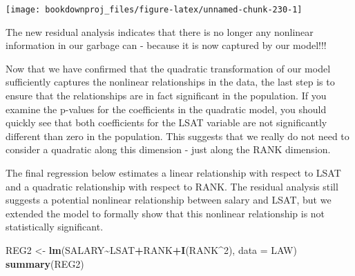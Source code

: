 \documentclass[
]{book}
\newenvironment{Shaded}{\begin{snugshade}}{\end{snugshade}}
\newcommand{\AttributeTok}[1]{\textcolor[rgb]{0.13,0.29,0.53}{#1}}
\newcommand{\DecValTok}[1]{\textcolor[rgb]{0.00,0.00,0.81}{#1}}
\newcommand{\FunctionTok}[1]{\textcolor[rgb]{0.13,0.29,0.53}{\textbf{#1}}}
\newcommand{\NormalTok}[1]{#1}
\newcommand{\OtherTok}[1]{\textcolor[rgb]{0.56,0.35,0.01}{#1}}
\newcommand{\SpecialCharTok}[1]{\textcolor[rgb]{0.81,0.36,0.00}{\textbf{#1}}}
\begin{document}
\begin{center}\texttt{[image: bookdownproj\_files/figure-latex/unnamed-chunk-230-1]} \end{center}

The new residual analysis indicates that there is no longer any nonlinear information in our garbage can - because it is now captured by our model!!!

Now that we have confirmed that the quadratic transformation of our model sufficiently captures the nonlinear relationships in the data, the last step is to ensure that the relationships are in fact significant in the population. If you examine the p-values for the coefficients in the quadratic model, you should quickly see that both coefficients for the LSAT variable are not significantly different than zero in the population. This suggests that we really do not need to consider a quadratic along this dimension - just along the RANK dimension.

The final regression below estimates a linear relationship with respect to LSAT and a quadratic relationship with respect to RANK. The residual analysis still suggests a potential nonlinear relationship between salary and LSAT, but we extended the model to formally show that this nonlinear relationship is not statistically significant.

\begin{Shaded}
\begin{Highlighting}[]
\NormalTok{REG2 }\OtherTok{\textless{}{-}} \FunctionTok{lm}\NormalTok{(SALARY}\SpecialCharTok{\textasciitilde{}}\NormalTok{LSAT}\SpecialCharTok{+}\NormalTok{RANK}\SpecialCharTok{+}\FunctionTok{I}\NormalTok{(RANK}\SpecialCharTok{\^{}}\DecValTok{2}\NormalTok{),}
           \AttributeTok{data =}\NormalTok{ LAW)}
\FunctionTok{summary}\NormalTok{(REG2)}
\end{Highlighting}
\end{Shaded}
\end{document}
